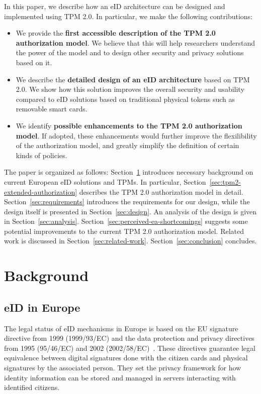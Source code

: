 \documentclass{sig-alternate-2013}
\begin{document}
In this paper, we describe how an eID architecture can be designed and
implemented using TPM 2.0. In particular, we make the following
contributions:
\begin{itemize}
\item We provide the \textbf{first accessible description of the TPM
  2.0 authorization model}. We believe that this will help researchers
  understand the power of the model and to design other security and
  privacy solutions based on it.
\item We describe the \textbf{detailed design of an eID architecture} 
  based on TPM 2.0. We show how this solution improves the overall
  security and usability compared to eID solutions based on traditional
  physical tokens such as removable smart cards.
\item We identify \textbf{possible enhancements to the TPM 2.0
  authorization model}. If adopted, these enhancements would further
  improve the flexilibility of the authorization model, and greatly
  simplify the definition of certain kinds of policies.
\end{itemize}

The paper is organized as follows: Section~\ref{sec:background}
introduces necessary background on current European eID solutions and
TPMs. In particular, Section~\ref{sec:tpm2-extended-authorization}
describes the TPM 2.0 authorization model in detail.
Section~\ref{sec:requirements} introduces the requirements for our
design, while the design itself is presented in
Section~\ref{sec:design}. An analysis of the design is given in
Section~\ref{sec:analysis}. Section~\ref{sec:perceived-ea-shortcomings}
suggests some potential improvements to the current TPM 2.0
authorization model. Related work is discussed in
Section~\ref{sec:related-work}. Section~\ref{sec:conclusion} concludes.

 
\setlength{\textfloatsep}{.05cm}

\section{Background}
\label{sec:background}

\subsection{eID in Europe}

The legal status of eID mechanisms in Europe is based on the EU signature
directive from 1999 (1999/93/EC) and the data protection and privacy directives
from 1995 (95/46/EC) and 2002 (2002/58/EC)~\cite{Mahler13}. These directives
guarantee legal equivalence between digital signatures done with the citizen
cards and physical signatures by the associated person. They set the privacy
framework for how identity information can be stored and managed in servers
interacting with identified citizens.
\end{document}
